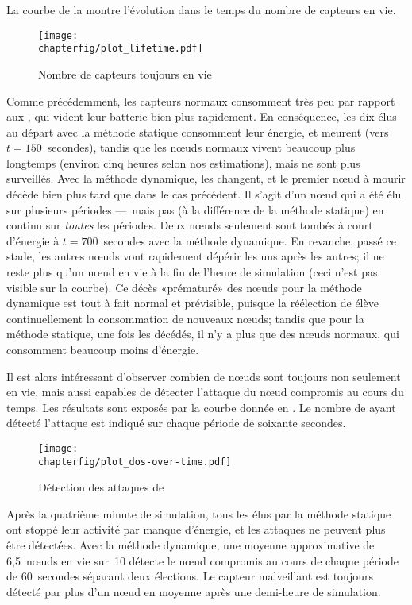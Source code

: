 La courbe de la  montre l'évolution dans le temps du nombre de capteurs en vie.
\begin{figure}[p]
    \centering
    \texttt{[image: \\chapterfig/plot\_lifetime.pdf]}
    \caption{Nombre de capteurs toujours en vie}\label{sa:fig:capteurs-en-vie}
\end{figure}
Comme précédemment, les capteurs normaux consomment très peu par rapport aux \cns, qui vident leur batterie bien plus rapidement.
En conséquence, les dix \cns élus au départ avec la méthode statique consomment leur énergie, et meurent (vers $t=150$~secondes), tandis que les nœuds normaux vivent beaucoup plus longtemps (environ cinq heures selon nos estimations), mais ne sont plus surveillés.
Avec la méthode dynamique, les \cns changent, et le premier nœud à mourir décède bien plus tard que dans le cas précédent.
Il s'agit d'un nœud qui a été élu \cn sur plusieurs périodes ---~mais pas (à la différence de la méthode statique) en continu sur \textit{toutes} les périodes.
Deux nœuds seulement sont tombés à court d'énergie à $t=700$~secondes avec la méthode dynamique.
En revanche, passé ce stade, les autres nœuds vont rapidement dépérir les uns après les autres; il ne reste plus qu'un nœud en vie à la fin de l'heure de simulation (ceci n'est pas visible sur la courbe).
Ce décès «prématuré» des nœuds pour la méthode dynamique est tout à fait normal et prévisible, puisque la réélection de \cns élève continuellement la consommation de nouveaux nœuds; tandis que pour la méthode statique, une fois les \cns décédés, il n'y a plus que des nœuds normaux, qui consomment beaucoup moins d'énergie.

Il est alors intéressant d'observer combien de nœuds sont toujours non seulement en vie, mais aussi capables de détecter l'attaque du nœud compromis au cours du temps.
Les résultats sont exposés par la courbe donnée en .
Le nombre de \cns ayant détecté l'attaque est indiqué sur chaque période de soixante secondes.
\begin{figure}[p]
    \centering
    \texttt{[image: \\chapterfig/plot\_dos-over-time.pdf]}
    \caption{Détection des attaques de \dds}\label{sa:fig:detection-dos}
\end{figure}
Après la quatrième minute de simulation, tous les \cns élus par la méthode statique ont stoppé leur activité par manque d'énergie, et les attaques ne peuvent plus être détectées.
Avec la méthode dynamique, une moyenne approximative de 6,5~nœuds en vie sur~10 détecte le nœud compromis au cours de chaque période de 60~secondes séparant deux élections.
Le capteur malveillant est toujours détecté par plus d'un nœud en moyenne après une demi-heure de simulation.
